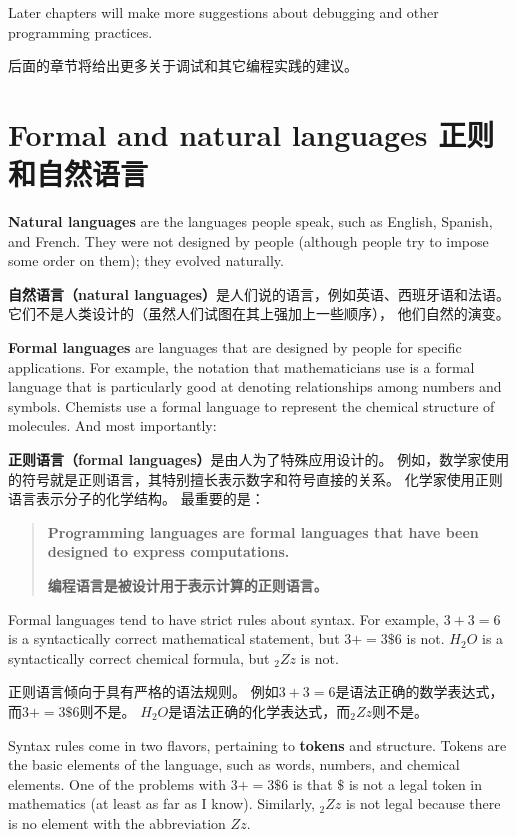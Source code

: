 \documentclass[10pt]{book}
\begin{document}
\begin{CJK}{UTF8}{gbsn}
Later chapters will make more suggestions about debugging and other
programming practices.

后面的章节将给出更多关于调试和其它编程实践的建议。

\section{Formal and natural languages 正则和自然语言}

{\bf Natural languages} are the languages people speak,
such as English, Spanish, and French.  They were not designed
by people (although people try to impose some order on them);
they evolved naturally.

{\bf 自然语言（natural languages）}是人们说的语言，例如英语、西班牙语和法语。
它们不是人类设计的（虽然人们试图在其上强加上一些顺序），
他们自然的演变。

{\bf Formal languages} are languages that are designed by people for
specific applications.  For example, the notation that mathematicians
use is a formal language that is particularly good at denoting
relationships among numbers and symbols.  Chemists use a formal
language to represent the chemical structure of molecules.  And
most importantly:

{\bf 正则语言（formal languages）}是由人为了特殊应用设计的。
例如，数学家使用的符号就是正则语言，其特别擅长表示数字和符号直接的关系。
化学家使用正则语言表示分子的化学结构。
最重要的是：

\begin{quote}
{\bf Programming languages are formal languages that have been
designed to express computations.}

{\bf 编程语言是被设计用于表示计算的正则语言。}
\end{quote}

Formal languages tend to have strict rules about syntax.  For example,
$3 + 3 = 6$ is a syntactically correct mathematical statement, but 
$3 + = 3 \mbox{\$} 6$ is not.
$H_2O$ is a syntactically correct
chemical formula, but $_2Zz$ is not.

正则语言倾向于具有严格的语法规则。
例如$3 + 3 = 6$是语法正确的数学表达式，而$3 + = 3 \mbox{\$} 6$则不是。
$H_2O$是语法正确的化学表达式，而$_2Zz$则不是。

Syntax rules come in two flavors, pertaining to {\bf tokens} and
structure.  Tokens are the basic elements of the language, such as
words, numbers, and chemical elements.  One of the problems with
$3 + = 3 \mbox{\$} 6$ is that \( \$ \) is not a legal token in mathematics
(at least as far as I know).  Similarly, $_2Zz$ is not legal because
there is no element with the abbreviation $Zz$.


\end{CJK}
\end{document}
